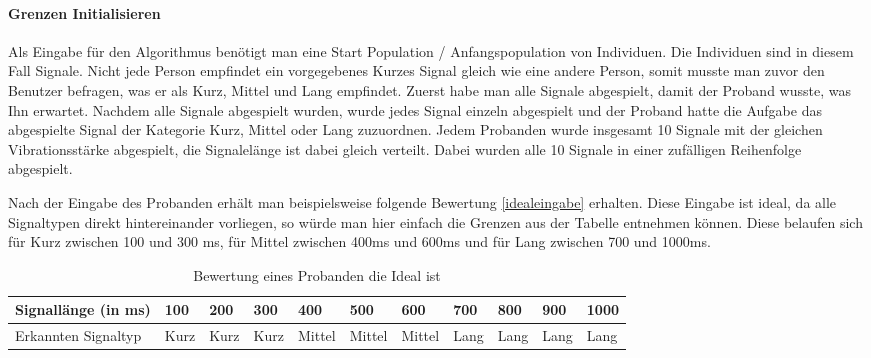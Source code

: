 
\paragraph{Grenzen Initialisieren}
Als Eingabe f{\"u}r den Algorithmus ben{\"o}tigt man eine Start Population / Anfangspopulation von Individuen. Die Individuen sind in diesem Fall Signale. 
Nicht jede Person empfindet ein vorgegebenes Kurzes Signal gleich wie eine andere Person, somit musste man zuvor den Benutzer befragen, was er als Kurz, Mittel und Lang empfindet. Zuerst habe man alle Signale abgespielt, damit der Proband wusste, was Ihn erwartet. 
Nachdem alle Signale abgespielt wurden, wurde jedes Signal einzeln abgespielt und der Proband hatte die Aufgabe das abgespielte Signal der Kategorie Kurz, Mittel oder Lang zuzuordnen. 
Jedem Probanden wurde insgesamt 10 Signale mit der gleichen Vibrationsst{\"a}rke abgespielt, die Signalel{\"a}nge ist dabei gleich verteilt.
Dabei wurden alle 10 Signale in einer zuf{\"a}lligen Reihenfolge abgespielt.

Nach der Eingabe des Probanden erh{\"a}lt man beispielsweise folgende Bewertung \autoref{idealeingabe} erhalten. Diese Eingabe ist ideal, da alle Signaltypen direkt hintereinander vorliegen, so w{\"u}rde man hier einfach die Grenzen aus der Tabelle entnehmen k{\"o}nnen. Diese belaufen sich f{\"u}r Kurz zwischen 100 und 300 ms, f{\"u}r Mittel zwischen 400ms und 600ms und f{\"u}r Lang zwischen 700 und 1000ms.

\begin{table}[]
\centering
\caption{Bewertung eines Probanden die Ideal ist}
\label{idealeingabe}
\begin{tabular}{|l|l|l|l|l|l|l|l|l|l|l|}
\hline
 Signall{\"a}nge (in ms) & 100 & 200 & 300 & 400 & 500 & 600 & 700 & 800 & 900 & 1000 \\ \hline
 Erkannten Signaltyp & Kurz & Kurz & Kurz & Mittel & Mittel & Mittel & Lang & Lang & Lang & Lang \\ \hline
\end{tabular}
\end{table}

